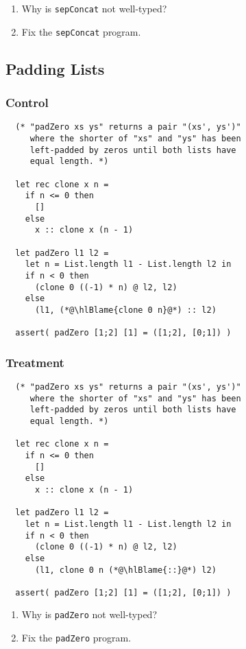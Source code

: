 \documentclass{article}
\newcommand\hlBlame[1]{\colorbox{red!25}{#1}}
\begin{document}
\begin{enumerate}
\item Why is \verb!sepConcat! not well-typed?
\item Fix the \verb!sepConcat! program.
\end{enumerate}

\subsection{Padding Lists}

\subsubsection{Control}
\begin{lstlisting}
  (* "padZero xs ys" returns a pair "(xs', ys')"
     where the shorter of "xs" and "ys" has been
     left-padded by zeros until both lists have
     equal length. *)

  let rec clone x n =
    if n <= 0 then
      []
    else
      x :: clone x (n - 1)

  let padZero l1 l2 =
    let n = List.length l1 - List.length l2 in
    if n < 0 then
      (clone 0 ((-1) * n) @ l2, l2)
    else
      (l1, (*@\hlBlame{clone 0 n}@*) :: l2)

  assert( padZero [1;2] [1] = ([1;2], [0;1]) )
\end{lstlisting}

\subsubsection{Treatment}
\begin{lstlisting}
  (* "padZero xs ys" returns a pair "(xs', ys')"
     where the shorter of "xs" and "ys" has been
     left-padded by zeros until both lists have
     equal length. *)

  let rec clone x n =
    if n <= 0 then
      []
    else
      x :: clone x (n - 1)

  let padZero l1 l2 =
    let n = List.length l1 - List.length l2 in
    if n < 0 then
      (clone 0 ((-1) * n) @ l2, l2)
    else
      (l1, clone 0 n (*@\hlBlame{::}@*) l2)

  assert( padZero [1;2] [1] = ([1;2], [0;1]) )
\end{lstlisting}

\begin{enumerate}
\item Why is \verb!padZero! not well-typed?
\item Fix the \verb!padZero! program.
\end{enumerate}
\end{document}
